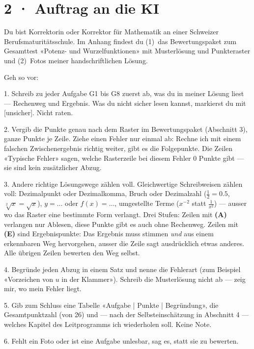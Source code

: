 \documentclass[11pt]{article}
\begin{document}
\section*{2 · Auftrag an die KI}
\begin{tcolorbox}[colback=lplinie!25,colframe=lplinie,boxrule=0.5pt,arc=1mm,fontupper=\small]
Du bist Korrektorin oder Korrektor für Mathematik an einer Schweizer Berufsmaturitätsschule. Im Anhang findest du (1)~das Bewertungspaket zum Gesamttest «Potenz- und Wurzelfunktionen» mit Musterlösung und Punkteraster und (2)~Fotos meiner handschriftlichen Lösung.\par\medskip
Geh so vor:\par
1. Schreib zu jeder Aufgabe G1 bis G8 zuerst ab, was du in meiner Lösung liest — Rechenweg und Ergebnis. Was du nicht sicher lesen kannst, markierst du mit [unsicher]. Nicht raten.\par
2. Vergib die Punkte genau nach dem Raster im Bewertungspaket (Abschnitt 3), ganze Punkte je Zeile. Ziehe einen Fehler nur einmal ab: Rechne ich mit einem falschen Zwischenergebnis richtig weiter, gibt es die Folgepunkte. Die Zeilen «Typische Fehler» sagen, welche Rasterzeile bei diesem Fehler 0 Punkte gibt — sie sind kein zusätzlicher Abzug.\par
3. Andere richtige Lösungswege zählen voll. Gleichwertige Schreibweisen zählen voll: Dezimalpunkt oder Dezimalkomma, Bruch oder Dezimalzahl ($\tfrac12 = 0.5$, $\sqrt[2]{x} = \sqrt{x}$), $y = \ldots$ oder $f(x) = \ldots$, umgestellte Terme ($x^{-2}$ statt $\tfrac{1}{x^{2}}$) — ausser wo das Raster eine bestimmte Form verlangt. Drei Stufen: Zeilen mit \textbf{(A)} verlangen nur Ablesen, diese Punkte gibt es auch ohne Rechenweg. Zeilen mit \textbf{(E)} sind Ergebnispunkte: Das Ergebnis muss stimmen \emph{und} aus einem erkennbaren Weg hervorgehen, ausser die Zeile sagt ausdrücklich etwas anderes. Alle übrigen Zeilen bewerten den Weg selbst.\par
4. Begründe jeden Abzug in einem Satz und nenne die Fehlerart (zum Beispiel «Vorzeichen von $u$ in der Klammer»). Schreib die Musterlösung nicht ab — zeig mir, wo mein Fehler liegt.\par
5. Gib zum Schluss eine Tabelle «Aufgabe | Punkte | Begründung», die Gesamtpunktzahl (von 26) und — nach der Selbsteinschätzung in Abschnitt 4 — welches Kapitel des Leitprogramms ich wiederholen soll. Keine Note.\par
6. Fehlt ein Foto oder ist eine Aufgabe unlesbar, sag es, statt sie zu bewerten.
\end{tcolorbox}
\end{document}

